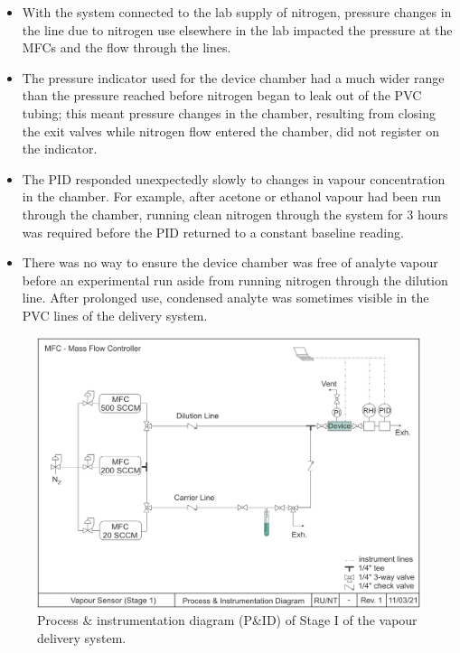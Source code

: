\documentclass[
  a4paper,
]{scrbook}
\begin{document}
\begin{itemize}
\item
  With the system connected to the lab supply of nitrogen, pressure
  changes in the line due to nitrogen use elsewhere in the lab impacted
  the pressure at the MFCs and the flow through the lines.
\item
  The pressure indicator used for the device chamber had a much wider
  range than the pressure reached before nitrogen began to leak out of
  the PVC tubing; this meant pressure changes in the chamber, resulting
  from closing the exit valves while nitrogen flow entered the chamber,
  did not register on the indicator.
\item
  The PID responded unexpectedly slowly to changes in vapour
  concentration in the chamber. For example, after acetone or ethanol
  vapour had been run through the chamber, running clean nitrogen
  through the system for 3 hours was required before the PID returned to
  a constant baseline reading.
\item
  There was no way to ensure the device chamber was free of analyte
  vapour before an experimental run aside from running nitrogen through
  the dilution line. After prolonged use, condensed analyte was
  sometimes visible in the PVC lines of the delivery system.
\end{itemize}

\begin{figure}

{\centering \includegraphics[width=1\textwidth,height=\textheight]{figures/ch8/PID_V1.png}

}

\caption[P\&ID of Stage I of the vapour delivery
system.]{\label{fig-stage-1-pid}Process \& instrumentation diagram
(P\&ID) of Stage I of the vapour delivery system.}

\end{figure}
\end{document}
